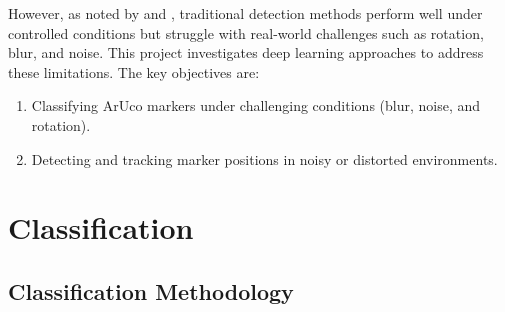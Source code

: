 \documentclass[conference]{IEEEtran}
\begin{document}
However, as noted by \textcite{FiducialMarkerNoisy} and \textcite{ROMERORAMIREZ2021104094}, traditional detection methods perform well
under controlled conditions but struggle with real-world challenges such as rotation, blur, and noise. This project investigates deep
learning approaches to address these limitations. The key objectives are:

\begin{enumerate}
  \item Classifying ArUco markers under challenging conditions (blur, noise, and rotation).
  \item Detecting and tracking marker positions in noisy or distorted environments.
\end{enumerate}

\section{Classification}

\subsection{Classification Methodology}
\end{document}
